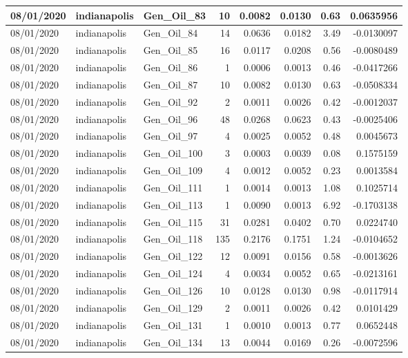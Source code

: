 \documentclass[
  letterpaper,
  DIV=11,
  numbers=noendperiod]{scrartcl}
\begin{document}
\begin{tabular}{l|l|l|r|r|r|r|r}
\hline
08/01/2020 & indianapolis & Gen\_Oil\_83 & 10 & 0.0082 & 0.0130 & 0.63 & 0.0635956\\
\hline
08/01/2020 & indianapolis & Gen\_Oil\_84 & 14 & 0.0636 & 0.0182 & 3.49 & -0.0130097\\
\hline
08/01/2020 & indianapolis & Gen\_Oil\_85 & 16 & 0.0117 & 0.0208 & 0.56 & -0.0080489\\
\hline
08/01/2020 & indianapolis & Gen\_Oil\_86 & 1 & 0.0006 & 0.0013 & 0.46 & -0.0417266\\
\hline
08/01/2020 & indianapolis & Gen\_Oil\_87 & 10 & 0.0082 & 0.0130 & 0.63 & -0.0508334\\
\hline
08/01/2020 & indianapolis & Gen\_Oil\_92 & 2 & 0.0011 & 0.0026 & 0.42 & -0.0012037\\
\hline
08/01/2020 & indianapolis & Gen\_Oil\_96 & 48 & 0.0268 & 0.0623 & 0.43 & -0.0025406\\
\hline
08/01/2020 & indianapolis & Gen\_Oil\_97 & 4 & 0.0025 & 0.0052 & 0.48 & 0.0045673\\
\hline
08/01/2020 & indianapolis & Gen\_Oil\_100 & 3 & 0.0003 & 0.0039 & 0.08 & 0.1575159\\
\hline
08/01/2020 & indianapolis & Gen\_Oil\_109 & 4 & 0.0012 & 0.0052 & 0.23 & 0.0013584\\
\hline
08/01/2020 & indianapolis & Gen\_Oil\_111 & 1 & 0.0014 & 0.0013 & 1.08 & 0.1025714\\
\hline
08/01/2020 & indianapolis & Gen\_Oil\_113 & 1 & 0.0090 & 0.0013 & 6.92 & -0.1703138\\
\hline
08/01/2020 & indianapolis & Gen\_Oil\_115 & 31 & 0.0281 & 0.0402 & 0.70 & 0.0224740\\
\hline
08/01/2020 & indianapolis & Gen\_Oil\_118 & 135 & 0.2176 & 0.1751 & 1.24 & -0.0104652\\
\hline
08/01/2020 & indianapolis & Gen\_Oil\_122 & 12 & 0.0091 & 0.0156 & 0.58 & -0.0013626\\
\hline
08/01/2020 & indianapolis & Gen\_Oil\_124 & 4 & 0.0034 & 0.0052 & 0.65 & -0.0213161\\
\hline
08/01/2020 & indianapolis & Gen\_Oil\_126 & 10 & 0.0128 & 0.0130 & 0.98 & -0.0117914\\
\hline
08/01/2020 & indianapolis & Gen\_Oil\_129 & 2 & 0.0011 & 0.0026 & 0.42 & 0.0101429\\
\hline
08/01/2020 & indianapolis & Gen\_Oil\_131 & 1 & 0.0010 & 0.0013 & 0.77 & 0.0652448\\
\hline
08/01/2020 & indianapolis & Gen\_Oil\_134 & 13 & 0.0044 & 0.0169 & 0.26 & -0.0072596\\

\end{tabular}
\end{document}
